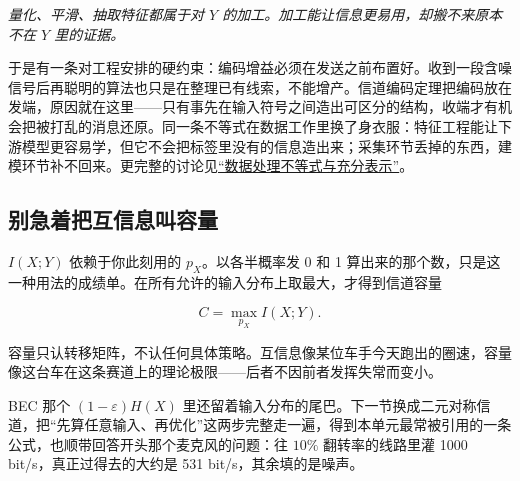 \begin{center}

\emph{量化、平滑、抽取特征都属于对 \(Y\) 的加工。加工能让信息更易用，却搬不来原本不在 \(Y\) 里的证据。}
\end{center}

于是有一条对工程安排的硬约束：编码增益必须在发送之前布置好。收到一段含噪信号后再聪明的算法也只是在整理已有线索，不能增产。信道编码定理把编码放在发端，原因就在这里——只有事先在输入符号之间造出可区分的结构，收端才有机会把被打乱的消息还原。同一条不等式在数据工作里换了身衣服：特征工程能让下游模型更容易学，但它不会把标签里没有的信息造出来；采集环节丢掉的东西，建模环节补不回来。更完整的讨论见\hyperref[sec:07-Information-Theory/02-Joint-Information/04]{``数据处理不等式与充分表示''}。

\subsection{别急着把互信息叫容量}

\(I(X;Y)\) 依赖于你此刻用的 \(p_X\)。以各半概率发 0 和 1 算出来的那个数，只是这一种用法的成绩单。在所有允许的输入分布上取最大，才得到信道容量

\[
C=\max_{p_X}I(X;Y).
\]

容量只认转移矩阵，不认任何具体策略。互信息像某位车手今天跑出的圈速，容量像这台车在这条赛道上的理论极限——后者不因前者发挥失常而变小。

BEC 那个 \((1-\varepsilon)H(X)\) 里还留着输入分布的尾巴。下一节换成二元对称信道，把``先算任意输入、再优化''这两步完整走一遍，得到本单元最常被引用的一条公式，也顺带回答开头那个麦克风的问题：往 \(10\%\) 翻转率的线路里灌 1000 bit/s，真正过得去的大约是 531 bit/s，其余填的是噪声。
